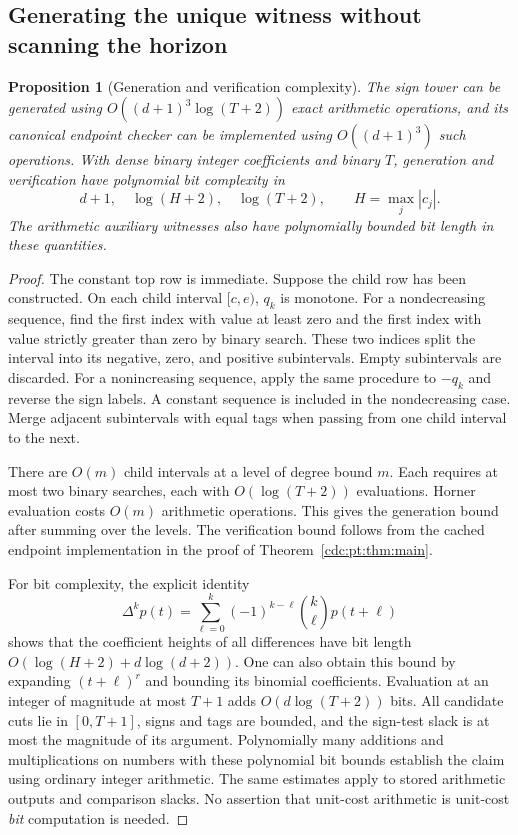 \documentclass[11pt,a4paper]{article}
\newtheorem{proposition}[proposition]{Proposition}
\theoremstyle{definition}
\theoremstyle{remark}
\begin{document}
\subsection{Generating the unique witness without scanning the horizon}
\begin{proposition}[Generation and verification complexity]
\label{cdc:pt:prop:complexity}
The sign tower can be generated using
$O((d+1)^3\log(T+2))$ exact arithmetic operations, and its canonical
endpoint checker can be implemented using $O((d+1)^3)$ such operations.
With dense binary integer coefficients and binary $T$, generation and
verification have polynomial bit complexity in
\[
 d+1,\quad \log(H+2),\quad\log(T+2),
 \qquad H=\max_j|c_j|.
\]
The arithmetic auxiliary witnesses also have polynomially bounded bit
length in these quantities.
\end{proposition}
\begin{proof}
The constant top row is immediate. Suppose the child row has been
constructed. On each child interval $[c,e)$, $q_k$ is monotone. For a
nondecreasing sequence, find the first index with value at least zero and
the first index with value strictly greater than zero by binary search.
These two indices split the interval into its negative, zero, and positive
subintervals. Empty subintervals are discarded. For a nonincreasing
sequence, apply the same procedure to $-q_k$ and reverse the sign labels.
A constant sequence is included in the nondecreasing case. Merge adjacent
subintervals with equal tags when passing from one child interval to the
next.

There are $O(m)$ child intervals at a level of degree bound $m$. Each
requires at most two binary searches, each with $O(\log(T+2))$
evaluations. Horner evaluation costs $O(m)$ arithmetic operations. This
gives the generation bound after summing over the levels. The verification
bound follows from the cached endpoint implementation in the proof of
Theorem~\ref{cdc:pt:thm:main}.

For bit complexity, the explicit identity
\[
 \Delta^kp(t)=\sum_{\ell=0}^k(-1)^{k-\ell}\binom{k}{\ell}p(t+\ell)
\]
shows that the coefficient heights of all differences have bit length
$O(\log(H+2)+d\log(d+2))$. One can also obtain this bound by expanding
$(t+\ell)^r$ and bounding its binomial coefficients. Evaluation at an
integer of magnitude at most $T+1$ adds
$O(d\log(T+2))$ bits. All candidate cuts lie in $[0,T+1]$, signs and
tags are bounded, and the sign-test slack is at most the magnitude of its
argument. Polynomially many additions and multiplications on numbers with
these polynomial bit bounds establish the claim using ordinary integer
arithmetic. The same estimates apply to stored arithmetic outputs and
comparison slacks. No assertion that unit-cost arithmetic is unit-cost
\emph{bit} computation is needed.
\end{proof}
\end{document}
